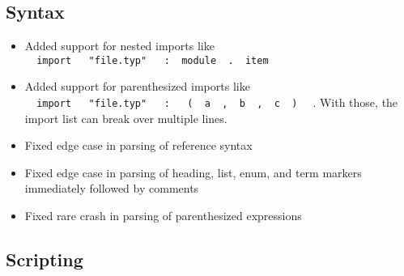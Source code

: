 \subsection{Syntax}\label{syntax}

\begin{itemize}
\tightlist
\item
  Added support for nested imports like
  \texttt{\ }{\texttt{\ import\ }}\texttt{\ }{\texttt{\ "file.typ"\ }}\texttt{\ }{\texttt{\ :\ }}\texttt{\ module\ }{\texttt{\ .\ }}\texttt{\ item\ }
\item
  Added support for parenthesized imports like
  \texttt{\ }{\texttt{\ import\ }}\texttt{\ }{\texttt{\ "file.typ"\ }}\texttt{\ }{\texttt{\ :\ }}\texttt{\ }{\texttt{\ (\ }}\texttt{\ a\ }{\texttt{\ ,\ }}\texttt{\ b\ }{\texttt{\ ,\ }}\texttt{\ c\ }{\texttt{\ )\ }}\texttt{\ }
  . With those, the import list can break over multiple lines.
\item
  Fixed edge case in parsing of reference syntax
\item
  Fixed edge case in parsing of heading, list, enum, and term markers
  immediately followed by comments
\item
  Fixed rare crash in parsing of parenthesized expressions
\end{itemize}

\subsection{Scripting}\label{scripting}

